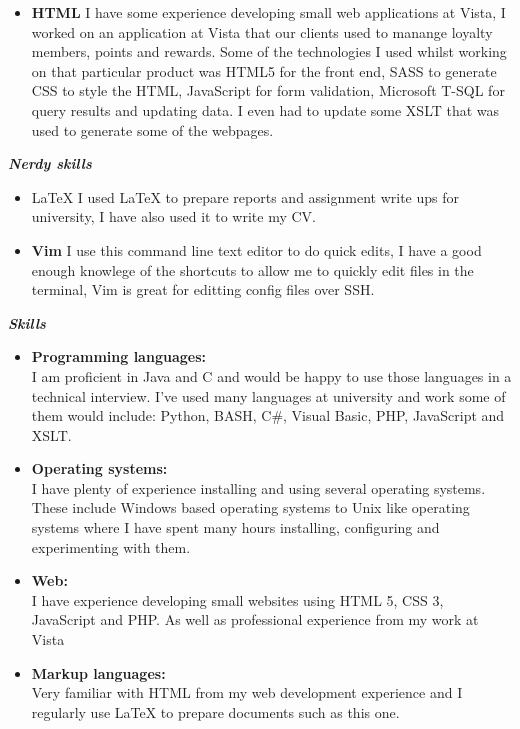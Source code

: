 \documentclass{res}
\begin{document}
\begin{resume}
\begin{itemize}
	\item \textbf{HTML} I have some experience developing small web applications at Vista, I worked on an application at Vista that our clients used to manange loyalty members, points and rewards. Some of the technologies I used whilst working on that particular product was HTML5 for the front end, SASS to generate CSS to style the HTML, JavaScript for form validation, Microsoft T-SQL for query results and updating data. I even had to update some XSLT that was used to generate some of the webpages.
\end{itemize}
\vspace{8pt}
{\sl \textbf{Nerdy skills}}
\begin{itemize}
	\item \LaTeX{} I used \LaTeX{} to prepare reports and assignment write ups for university, I have also used it to write my CV.
	\item \textbf{Vim} I use this command line text editor to do quick edits, I have a good enough knowlege of the shortcuts to allow me to quickly edit files in the terminal, Vim is great for editting config files over SSH.
\end{itemize}
{\sl \textbf{Skills}}
  
   \begin{itemize} \itemsep -2pt %
   \item \textbf{Programming languages:} \\ \hfill I am proficient in Java and C and would be happy to use those languages in a technical interview.
   I've used many languages at university and work some of them would include: Python, BASH, C\#, Visual Basic, PHP, JavaScript and XSLT. 
   \item \textbf{Operating systems:} \\ \hfill I have plenty of experience installing and using several operating systems. These include Windows based operating systems to Unix like operating systems where I have spent many hours installing, configuring and experimenting with them.
   \item \textbf{Web:} \\ \hfill I have experience developing small websites using HTML 5, CSS 3, JavaScript and PHP.
   As well as professional experience from my work at Vista
   \item \textbf{Markup languages:} \\ Very familiar with HTML from my web development experience and I regularly use \LaTeX{} to prepare documents such as this one.


\end{itemize}
\end{resume}
\end{document}
